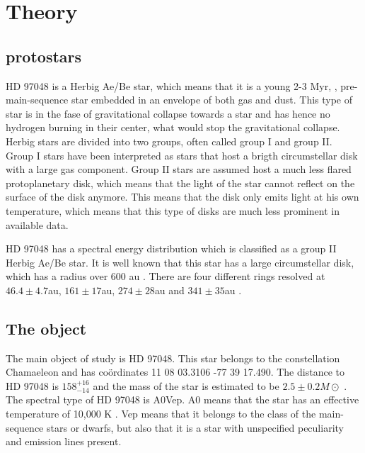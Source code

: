 \documentclass[twoside,single]{lion-msc}
\begin{document}
\chapter{Theory}
\section{protostars}
HD 97048 is a Herbig Ae/Be star, which means that it is a young 2-3 Myr, \cite{VanDenAncker1998}, pre-main-sequence star embedded in an envelope of both gas and dust. This type of star is in the fase of gravitational collapse towards a star and has hence no hydrogen burning in their center, what would stop the gravitational collapse. Herbig stars are divided into two groups, often called group I and group II. Group I stars have been interpreted as stars that host a brigth circumstellar disk with a large gas component. Group II stars are assumed host a much less flared protoplanetary disk, which means that the light of the star cannot reflect on the surface of the disk anymore. This means that the disk only emits light at his own temperature, which means that this type of disks are much less prominent in available data.
\bigskip 

HD 97048 has a spectral energy distribution which is classified as a group II Herbig Ae/Be star. It is well known that this star has a large circumstellar disk, which has a radius over 600 au \cite{Doering2007}. There are four different rings resolved at $46.4\pm 4.7$au, $161\pm 17$au,	$274\pm 28$au and $341\pm 35$au \cite{Ginski2016}.

\section{The object}
The main object of study is HD 97048. This star belongs to the constellation Chamaeleon and has co\"ordinates 11 08 03.3106 -77 39 17.490. The distance to HD 97048 is $158^{+16}_{-14}$  \cite{VanLeeuwen2007} and the mass of the star is estimated to be $2.5\pm 0.2 M\odot$ \cite{VanDenAncker1998}. The spectral type of HD 97048 is A0Vep. A0 means that the star has an effective temperature of 10,000 K \cite{Maaskant2013}. Vep means that it belongs to the class of the main-sequence stars or dwarfs, but also that it is a star with unspecified peculiarity and emission lines present.
\bigskip
\end{document}

